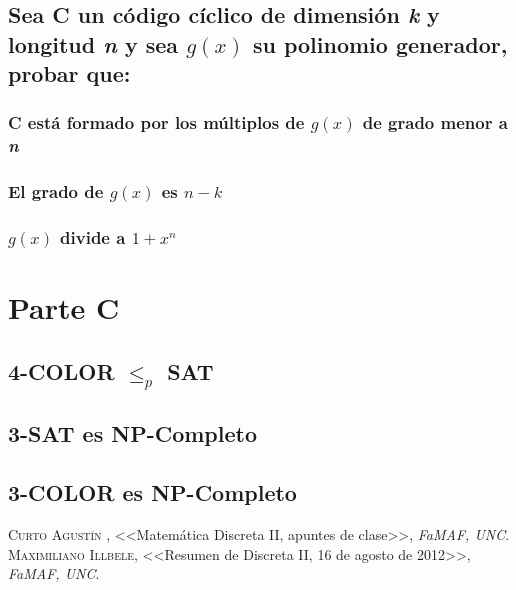 \documentclass[12pt,a4paper]{report}
\begin{document}
	
	\section{Sea C un código cíclico de dimensión \textit{k} y longitud \textit{n} y sea $g(x)$ su polinomio generador, probar que:}
	
		\subsection{C está formado por los múltiplos de $g(x)$ de grado menor a \textit{n}}
		
		\subsection{El grado de $g(x)$ es $n-k$}
		
		\subsection{$g(x)$ divide a $1+x^{n}$}
		
		

\chapter{Parte C}

	\section{4-COLOR $\leq_{\textit{p}}$ SAT}
	
	\section{3-SAT es NP-Completo}
	
	\section{3-COLOR es NP-Completo}
	
	
\begin{thebibliography}{X}
 \textsc{Curto Agustín },
<<Matemática Discreta II, apuntes de clase>>,
\textit{FaMAF, UNC}.
 \textsc{Maximiliano Illbele},
<<Resumen de Discreta II, 16 de agosto de 2012>>,
\textit{FaMAF, UNC}.
\end{thebibliography}
\end{document}
